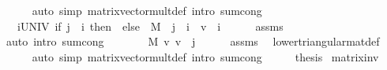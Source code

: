 \begin{isabellebody}
\ \ \ \ \isamarkupfalse%
\ {\isacharparenleft}{\kern0pt}auto\ simp{\isacharcolon}{\kern0pt}\ matrix{\isacharunderscore}{\kern0pt}vector{\isacharunderscore}{\kern0pt}mult{\isacharunderscore}{\kern0pt}def\ intro{\isacharbang}{\kern0pt}{\isacharcolon}{\kern0pt}\ sum{\isachardot}{\kern0pt}cong{\isacharparenright}{\kern0pt}\isanewline
\ \ \isamarkupfalse%
\ \isamarkupfalse%
\ {\isachardoublequoteopen}{\isasymdots}\ {\isacharequal}{\kern0pt}\ {\isacharparenleft}{\kern0pt}{\isasymSum}i{\isasymin}UNIV{\isachardot}{\kern0pt}\ {\isacharparenleft}{\kern0pt}if\ j\ {\isacharless}{\kern0pt}\ i\ then\ {}\ else\ \ M\ {\isachardollar}{\kern0pt}\ j\ {\isachardollar}{\kern0pt}\ i\ {\isacharasterisk}{\kern0pt}\ v{\isacharprime}{\kern0pt}\ {\isachardollar}{\kern0pt}\ i{\isacharparenright}{\kern0pt}{\isacharparenright}{\kern0pt}{\isachardoublequoteclose}\isanewline
\ \ \ \ \isamarkupfalse%
\ assms\isanewline
\ \ \ \ \isamarkupfalse%
\ {\isacharparenleft}{\kern0pt}auto\ intro{\isacharbang}{\kern0pt}{\isacharcolon}{\kern0pt}\ sum{\isachardot}{\kern0pt}cong{\isacharparenright}{\kern0pt}\isanewline
\ \ \isamarkupfalse%
\ \isamarkupfalse%
\ {\isachardoublequoteopen}{\isasymdots}\ {\isacharequal}{\kern0pt}\ {\isacharparenleft}{\kern0pt}M\ {\isacharasterisk}{\kern0pt}v\ v{\isacharprime}{\kern0pt}{\isacharparenright}{\kern0pt}\ {\isachardollar}{\kern0pt}\ j{\isachardoublequoteclose}\isanewline
\ \ \ \ \isamarkupfalse%
\ assms\ \isamarkupfalse%
\ lower{\isacharunderscore}{\kern0pt}triangular{\isacharunderscore}{\kern0pt}mat{\isacharunderscore}{\kern0pt}def\isanewline
\ \ \ \ \isamarkupfalse%
\ {\isacharparenleft}{\kern0pt}auto\ simp{\isacharcolon}{\kern0pt}\ matrix{\isacharunderscore}{\kern0pt}vector{\isacharunderscore}{\kern0pt}mult{\isacharunderscore}{\kern0pt}def\ intro{\isacharbang}{\kern0pt}{\isacharcolon}{\kern0pt}\ sum{\isachardot}{\kern0pt}cong{\isacharparenright}{\kern0pt}\isanewline
\ \ \isamarkupfalse%
\ \isamarkupfalse%
\ {\isacharquery}{\kern0pt}thesis\isacommand{{\isachardot}{\kern0pt}}\isamarkupfalse%
\isanewline
{}\isamarkupfalse%
%
\endisatagproof
{\isafoldproof}%
%
\isadelimproof
%
\endisadelimproof
%
\isadelimdocument
%
\endisadelimdocument
%
\isatagdocument
%
\isamarkuptrue%
%
\endisatagdocument
{\isafolddocument}%
%
\isadelimdocument
%
\endisadelimdocument
{}\isamarkupfalse%
\ matrix{\isacharunderscore}{\kern0pt}inv{\isacharcolon}{\kern0pt}\isanewline

\end{isabellebody}
